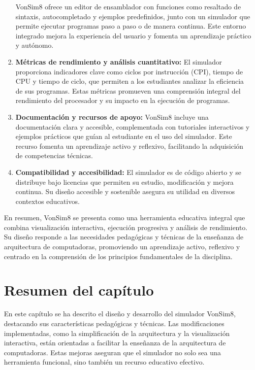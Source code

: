 \documentclass[12pt,oneside]{templates/unerthesis}
\begin{document}
\begin{enumerate}
  VonSim8 ofrece un editor de ensamblador con funciones como resaltado de sintaxis, autocompletado y ejemplos predefinidos, junto con un simulador que permite ejecutar programas paso a paso o de manera continua. Este entorno integrado mejora la experiencia del usuario y fomenta un aprendizaje práctico y autónomo.
\item
  \textbf{Métricas de rendimiento y análisis cuantitativo:}
  El simulador proporciona indicadores clave como ciclos por instrucción (CPI), tiempo de CPU y tiempo de ciclo, que permiten a los estudiantes analizar la eficiencia de sus programas. Estas métricas promueven una comprensión integral del rendimiento del procesador y su impacto en la ejecución de programas.
\item
  \textbf{Documentación y recursos de apoyo:}
  VonSim8 incluye una documentación clara y accesible, complementada con tutoriales interactivos y ejemplos prácticos que guían al estudiante en el uso del simulador. Este recurso fomenta un aprendizaje activo y reflexivo, facilitando la adquisición de competencias técnicas.
\item
  \textbf{Compatibilidad y accesibilidad:}
  El simulador es de código abierto y se distribuye bajo licencias que permiten su estudio, modificación y mejora continua. Su diseño accesible y sostenible asegura su utilidad en diversos contextos educativos.
\end{enumerate}

En resumen, VonSim8 se presenta como una herramienta educativa integral que combina visualización interactiva, ejecución progresiva y análisis de rendimiento. Su diseño responde a las necesidades pedagógicas y técnicas de la enseñanza de arquitectura de computadoras, promoviendo un aprendizaje activo, reflexivo y centrado en la comprensión de los principios fundamentales de la disciplina.

\hypertarget{resumen-del-capuxedtulo}{%
\section{Resumen del capítulo}\label{resumen-del-capuxedtulo}}

En este capítulo se ha descrito el diseño y desarrollo del simulador VonSim8, destacando sus características pedagógicas y técnicas. Las modificaciones implementadas, como la simplificación de la arquitectura y la visualización interactiva, están orientadas a facilitar la enseñanza de la arquitectura de computadoras. Estas mejoras aseguran que el simulador no solo sea una herramienta funcional, sino también un recurso educativo efectivo.
\end{document}

